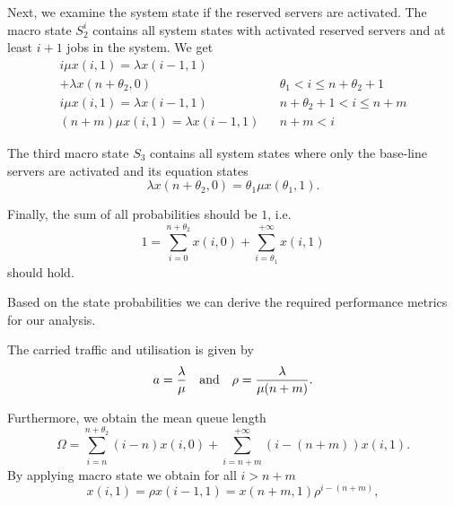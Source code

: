 Next, we examine the system state if the reserved servers are activated.
The macro state \(S_2^i\) contains all system states with activated reserved servers and at least \(i+1\) jobs in the system.
We get
\begin{align}
i\mu x(i,1) = \lambda x(i-1,1)\nonumber\\
 + \lambda x(n+\theta_2,0) && \theta_1<i\leq n+\theta_2+1\label{eq:cloud:data_centers:modeling:energy_efficient:S2_1}\\
 i\mu x(i,1) = \lambda  x(i-1,1) && n+\theta_2+1<i\leq n+m\label{eq:cloud:data_centers:modeling:energy_efficient:S2_2}\\
 (n+m)\mu x(i,1) =\lambda x(i-1,1) && n+m<i\label{eq:cloud:data_centers:modeling:energy_efficient:S2_3}
\end{align}

The third macro state \(S_3\) contains all system states where only the base-line servers are activated and its equation states
\begin{equation}
\lambda x(n+\theta_2,0) = \theta_1\mu x(\theta_1,1)\label{eq:cloud:data_centers:modeling:energy_efficient:S3}.
\end{equation}

Finally, the sum of all probabilities should be \(1\), i.e.
\begin{equation}
1=\sum_{i=0}^{n+\theta_2} x(i,0)+\sum_{i=\theta_1}^{+\infty}x(i,1)\label{eq:cloud:data_centers:modeling:normative}
\end{equation}
should hold.

Based on the state probabilities we can derive the required performance metrics for our analysis.

The carried traffic and utilisation is given by
\begin{equation*}
a = \frac{\lambda}{\mu} \text{\quad and\quad} \rho=\frac{\lambda}{\mu(n+m)}.
\end{equation*}

Furthermore, we obtain the mean queue length
\begin{equation*}
\Omega = \sum_{i=n}^{n+\theta_2} (i-n)x(i,0) + \sum_{i=n+m}^{+\infty} (i-(n+m))x(i,1).
\end{equation*}
By applying macro state  we obtain for all \(i>n+m\)
\begin{equation}
x(i,1) = \rho x(i-1,1) = x(n + m,1)\rho^{i-(n+m)},
\label{eq:cloud:data_centers:modeling:x_i_redefinition}
\end{equation} 

